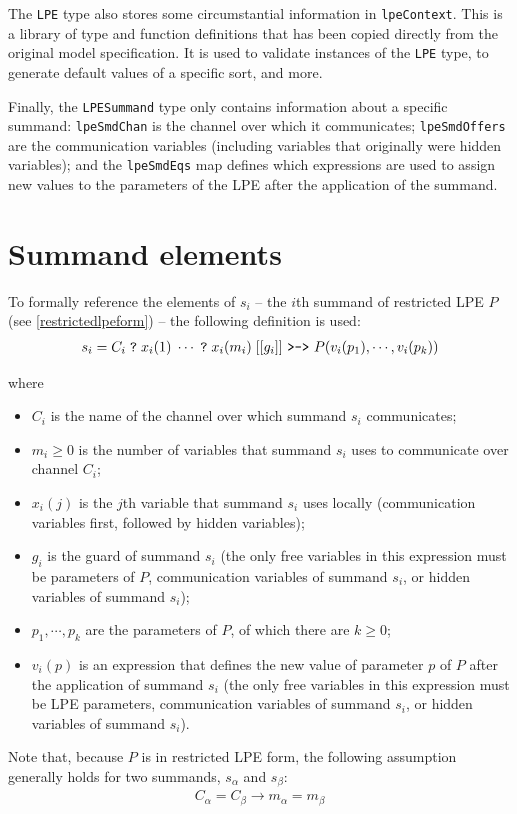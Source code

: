 The \texttt{LPE} type also stores some circumstantial information in \texttt{lpeContext}.
This is a library of \txs{} type and function definitions that has been copied directly from the original \txs{} model specification.
It is used to validate instances of the \texttt{LPE} type, to generate default values of a specific sort, and more.

Finally, the \texttt{LPESummand} type only contains information about a specific summand: \texttt{lpeSmdChan} is the channel over which it communicates; \texttt{lpeSmdOffers} are the communication variables (including variables that originally were hidden variables); and the \texttt{lpeSmdEqs} map defines which expressions are used to assign new values to the parameters of the LPE after the application of the summand.

\section{Summand elements} \label{summandelements}

To formally reference the elements of $s_i$ -- the $i$th summand of restricted LPE $P$ (see \ref{restrictedlpeform}) -- the following definition is used:
\begin{align*}
s_i = C_i \; \texttt{?} \; x_i(1) \; \cdots{} \; \texttt{?} \; x_i(m_i) \; [[g_i]] \text{ \texttt{>->} } P(v_i(p_1), \cdots{}, v_i(p_k))
\end{align*}

where

\begin{itemize}
\item $C_i$ is the name of the channel over which summand $s_i$ communicates;
\item $m_i \geq 0$ is the number of variables that summand $s_i$ uses to communicate over channel $C_i$;
\item $x_i(j)$ is the $j$th variable that summand $s_i$ uses locally (communication variables first, followed by hidden variables);
\item $g_i$ is the guard of summand $s_i$ (the only free variables in this expression must be parameters of $P$, communication variables of summand $s_i$, or hidden variables of summand $s_i$);
\item $p_1, \cdots{}, p_k$ are the parameters of $P$, of which there are $k \geq 0$;
\item $v_i(p)$ is an expression that defines the new value of parameter $p$ of $P$ after the application of summand $s_i$ (the only free variables in this expression must be LPE parameters, communication variables of summand $s_i$, or hidden variables of summand $s_i$).
\end{itemize}

Note that, because $P$ is in restricted LPE form, the following assumption generally holds for two summands, $s_\alpha$ and $s_\beta$:
\begin{align*}
C_\alpha = C_\beta \rightarrow m_\alpha = m_\beta
\end{align*}

